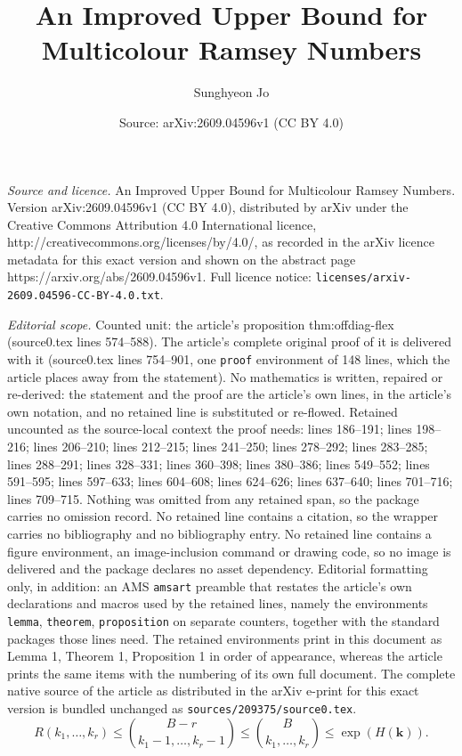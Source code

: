 \documentclass[10pt,a4paper]{amsart}
\title{An Improved Upper Bound for Multicolour Ramsey Numbers}
\author{Sunghyeon Jo}
\date{Source: arXiv:2609.04596v1 (CC BY 4.0)}
\newcommand{\Ent}{H}
\newcommand{\kk}{\mathbf k}
\begin{document}
\maketitle

\noindent\emph{Source and licence.} An Improved Upper Bound for Multicolour Ramsey Numbers. Version arXiv:2609.04596v1 (CC BY 4.0), distributed by arXiv under the Creative Commons Attribution 4.0 International licence, http://creativecommons.org/licenses/by/4.0/, as recorded in the arXiv licence metadata for this exact version and shown on the abstract page https://arxiv.org/abs/2609.04596v1. Full licence notice: \texttt{licenses/arxiv-2609.04596-CC-BY-4.0.txt}.\par\smallskip

\noindent\textit{Editorial scope.} Counted unit: the article's proposition thm:offdiag-flex (source0.tex lines 574--588). The article's complete original proof of it is delivered with it (source0.tex lines 754--901, one \texttt{proof} environment of 148 lines, which the article places away from the statement). No mathematics is written, repaired or re-derived: the statement and the proof are the article's own lines, in the article's own notation, and no retained line is substituted or re-flowed.  Retained uncounted as the source-local context the proof needs: lines 186--191; lines 198--216; lines 206--210; lines 212--215; lines 241--250; lines 278--292; lines 283--285; lines 288--291; lines 328--331; lines 360--398; lines 380--386; lines 549--552; lines 591--595; lines 597--633; lines 604--608; lines 624--626; lines 637--640; lines 701--716; lines 709--715.  Nothing was omitted from any retained span, so the package carries no omission record.  No retained line contains a citation, so the wrapper carries no bibliography and no bibliography entry.  No retained line contains a figure environment, an image-inclusion command or drawing code, so no image is delivered and the package declares no asset dependency.  Editorial formatting only, in addition: an AMS \texttt{amsart} preamble that restates the article's own declarations and macros used by the retained lines, namely the environments \texttt{lemma}, \texttt{theorem}, \texttt{proposition} on separate counters, together with the standard packages those lines need.  The retained environments print in this document as Lemma 1, Theorem 1, Proposition 1 in order of appearance, whereas the article prints the same items with the numbering of its own full document.  The complete native source of the article as distributed in the arXiv e-print for this exact version is bundled unchanged as \texttt{sources/209375/source0.tex}.
\begin{equation}\label{eq:ES}
 R(k_1,\ldots,k_r)
 \le \binom{B-r}{k_1-1,\ldots,k_r-1}
 \le \binom{B}{k_1,\ldots,k_r}
 \le \exp(\Ent(\kk)).
\end{equation}
\end{document}
